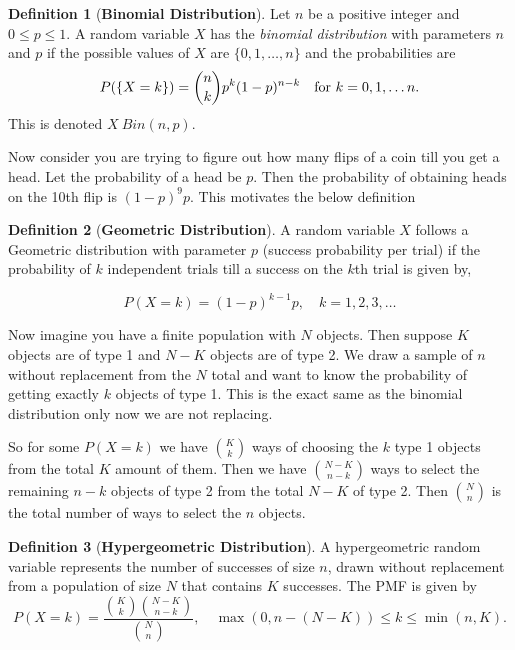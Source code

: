 \documentclass{article}
\theoremstyle{definition}
\newtheorem{definition}{Definition}[section]
\theoremstyle{remark}
\begin{document}
\begin{definition}[\textbf{Binomial Distribution}]
Let $n$ be a positive integer and $ 0 \leq p \leq 1$. A random variable $X$ has the \textit{binomial distribution} with parameters
$n$ and $p$ if the possible values of $X$ are $\{0,1,\dots,n\}$ and the probabilities are 
\[
P(\{X=k\}) = \binom{n}{k}p^k(1-p)^{n-k} \quad \textnormal{for } k = 0,1,\dots n.
\]
This is denoted $X ~ Bin(n,p)$.

\end{definition}


\par Now consider you are trying to figure out how many flips of a coin 
till you get a head. Let the probability of a head be $p$. Then the probability 
of obtaining heads on the 10th flip is $(1-p)^{9}p$. This motivates the below definition


\begin{definition}[\textbf{Geometric Distribution}]
A random variable \( X \) follows a Geometric distribution with parameter \( p \) (success probability per trial) if the probability of $k$ independent trials till a success on the $k$th trial is given by,

\[
P(X = k) = (1 - p)^{k-1} p, \quad k = 1, 2, 3, \dots
\]
\end{definition}

\par Now imagine you have a finite population with 
$N$ objects. Then suppose $K$ objects are of type 1 and $N-K$ objects
are of type 2. We draw a sample of $n$ without replacement from the $N$ total and 
want to know the probability of getting exactly $k$ objects of type 1. This is the exact 
same as the binomial distribution only now we are not replacing. 
\par So for some $P(X=k)$ we have $\binom{K}{k}$ ways 
of choosing the $k$ type 1 objects from the total $K$ amount of them. Then we have $\binom{N-K}{n-k}$ ways
to select the remaining $n-k$ objects of type 2 from the total $N-K$ of type 2.
Then $\binom{N}{n}$ is the total number of ways to select the $n$ objects. 

\begin{definition}[\textbf{Hypergeometric Distribution}]
A hypergeometric random variable represents the number of successes of size $n$, drawn without replacement from a population of size \( N \) that contains \( K \) successes. The PMF is given by
\[
P(X = k) = \frac{\binom{K}{k} \binom{N - K}{n - k}}{\binom{N}{n}}, \quad \max(0, n - (N - K)) \leq k \leq \min(n, K).
\]
\end{definition}
\end{document}
